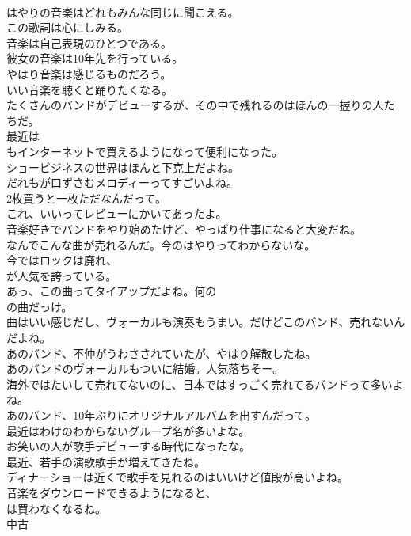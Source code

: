 \documentclass[8pt]{extreport}
\begin{document}
\begin{CJK}{UTF8}{min}
\\	はやりの音楽はどれもみんな同じに聞こえる。	
\\	この歌詞は心にしみる。	
\\	音楽は自己表現のひとつである。	
\\	彼女の音楽は10年先を行っている。	
\\	やはり音楽は感じるものだろう。	
\\	いい音楽を聴くと踊りたくなる。	
\\	たくさんのバンドがデビューするが、その中で残れるのはほんの一握りの人たちだ。	
\\	最近は
\\	もインターネットで買えるようになって便利になった。	
\\	ショービジネスの世界はほんと下克上だよね。	
\\	だれもが口ずさむメロディーってすごいよね。	
\\	2枚買うと一枚ただなんだって。	
\\	これ、いいってレビューにかいてあったよ。	
\\	音楽好きでバンドをやり始めたけど、やっぱり仕事になると大変だね。	
\\	なんでこんな曲が売れるんだ。今のはやりってわからないな。	
\\	今ではロックは廃れ、
\\	が人気を誇っている。	
\\	あっ、この曲ってタイアップだよね。何の
\\	の曲だっけ。	
\\	曲はいい感じだし、ヴォーカルも演奏もうまい。だけどこのバンド、売れないんだよね。	
\\	あのバンド、不仲がうわさされていたが、やはり解散したね。	
\\	あのバンドのヴォーカルもついに結婚。人気落ちそー。	
\\	海外ではたいして売れてないのに、日本ではすっごく売れてるバンドって多いよね。	
\\	あのバンド、10年ぶりにオリジナルアルバムを出すんだって。	
\\	最近はわけのわからないグループ名が多いよな。	
\\	お笑いの人が歌手デビューする時代になったな。	
\\	最近、若手の演歌歌手が増えてきたね。	
\\	ディナーショーは近くで歌手を見れるのはいいけど値段が高いよね。	
\\	音楽をダウンロードできるようになると、
\\	は買わなくなるね。	
\\	中古

\end{CJK}
\end{document}
